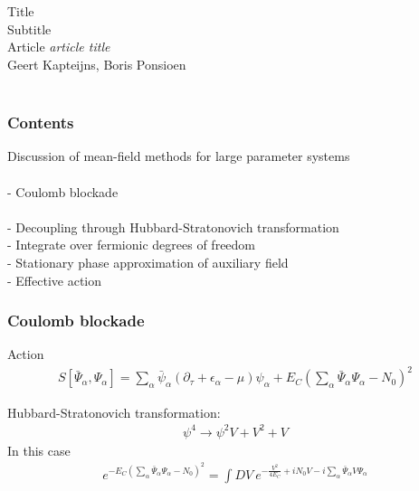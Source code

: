 \documentclass[]{beamer}
\begin{document}
\usetikzlibrary{snakes, shapes, calc}
\usetikzlibrary{mindmap,trees, matrix}

\color{white}

\begin{frame}[t]\frametitle{~}

  {\LARGE{ Title }}\\ {\large{Subtitle}}\\
  \vspace{20pt}
  {\small{Article \textit{article title }}}\\
  \vspace{60pt}
  Geert Kapteijns, Boris Ponsioen\\
  ~\\


\end{frame}

\begin{frame}[t]\frametitle{Contents}

Discussion of mean-field methods for large parameter systems \\
  ~\\
  - Coulomb blockade \\
  ~\\
  - Decoupling through Hubbard-Stratonovich transformation \\
  - Integrate over fermionic degrees of freedom \\
  - Stationary phase approximation of auxiliary field \\
  - Effective action

\end{frame}

\begin{frame}[t]\frametitle{Coulomb blockade}
Action
\begin{align*}
S[\bar{\Psi}_{\alpha}, \Psi_{\alpha}] = \sum_{\alpha} \bar{\psi}_{\alpha} (\partial_{\tau} + \epsilon_{\alpha} - \mu) \psi_{\alpha}
 + E_C (\sum_{\alpha} \bar{\Psi}_{\alpha} \Psi_{\alpha} - N_0)^2
\end{align*}

Hubbard-Stratonovich transformation:
\begin{align*}
\psi^4 \to \psi^2 V + V^2 + V
\end{align*}
In this case
\begin{align*}
e^{-E_C (\sum_{\alpha} \bar{\Psi}_{\alpha} \Psi_{\alpha} - N_0)^2 }
  = \int DV ~ e^{-\frac{V^2}{4 E_C} + i N_0 V - i \sum_{\alpha} \bar{\Psi}_{\alpha} V \Psi_{\alpha}}
\end{align*}
\end{frame}
\end{document}
